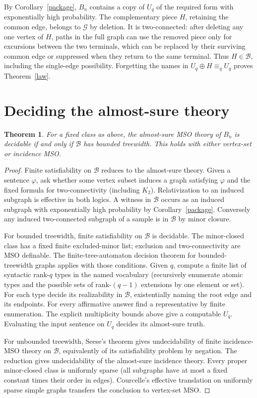 \documentclass[11pt]{article}
\newtheorem{theorem}{Theorem}
\newcommand{\B}{\mathcal B}
\newcommand{\G}{\mathcal G}
\begin{document}
By Corollary~\ref{package}, $B_n$ contains a copy of $U_q$ of the required form with exponentially high probability. The complementary piece $H$, retaining the common edge, belongs to $\G$ by deletion. It is two-connected: after deleting any one vertex of $H$, paths in the full graph can use the removed piece only for excursions between the two terminals, which can be replaced by their surviving common edge or suppressed when they return to the same terminal. Thus $H\in\B$, including the single-edge possibility. Forgetting the names in $U_q\oplus H\equiv_q U_q$ proves Theorem~\ref{law}.

\section{Deciding the almost-sure theory}
\begin{theorem}
For a fixed class as above, the almost-sure MSO theory of $B_n$ is decidable if and only if $\B$ has bounded treewidth. This holds with either vertex-set or incidence MSO.
\end{theorem}
\begin{proof}
Finite satisfiability on $\B$ reduces to the almost-sure theory. Given a sentence $\varphi$, ask whether some vertex subset induces a graph satisfying $\varphi$ and the fixed formula for two-connectivity (including $K_2$). Relativization to an induced subgraph is effective in both logics. A witness in $\B$ occurs as an induced subgraph with exponentially high probability by Corollary~\ref{package}. Conversely any induced two-connected subgraph of a sample is in $\B$ by minor closure.

For bounded treewidth, finite satisfiability on $\B$ is decidable. The minor-closed class has a fixed finite excluded-minor list; exclusion and two-connectivity are MSO definable. The finite-tree-automaton decision theorem for bounded-treewidth graphs \cite{courcelle} applies with those conditions. Given $q$, compute a finite list of syntactic rank-$q$ types in the named vocabulary (recursively enumerate atomic types and the possible sets of rank-$(q-1)$ extensions by one element or set). For each type decide its realizability in $\B$, existentially naming the root edge and its endpoints. For every affirmative answer find a representative by finite enumeration. The explicit multiplicity bounds above give a computable $U_q$. Evaluating the input sentence on $U_q$ decides its almost-sure truth.

For unbounded treewidth, Seese's theorem \cite{seese} gives undecidability of finite incidence-MSO theory on $\B$, equivalently of its satisfiability problem by negation. The reduction gives undecidability of the almost-sure incidence theory. Every proper minor-closed class is uniformly sparse (all subgraphs have at most a fixed constant times their order in edges). Courcelle's effective translation on uniformly sparse simple graphs \cite{sparse} transfers the conclusion to vertex-set MSO.
\end{proof}
\end{document}
